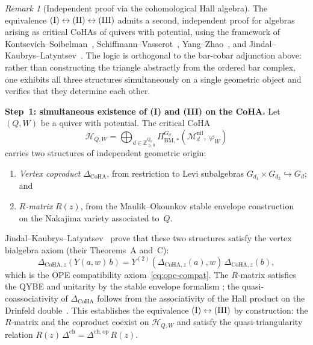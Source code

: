 \documentclass[11pt,reqno]{amsart}
\theoremstyle{definition}
\theoremstyle{remark}
\newtheorem{remark}[theorem]{Remark}
\newcommand{\cH}{\mathcal{H}}
\newcommand{\cM}{\mathcal{M}}
\newcommand{\ZZ}{\mathbb{Z}}
\newcommand{\op}{\mathrm{op}}
\numberwithin{equation}{section}
\begin{document}
\begin{remark}[Independent proof via the cohomological Hall algebra]
\label{rem:independent-proof-coha}
The equivalence $\textup{(I)} \leftrightarrow \textup{(II)}
\leftrightarrow \textup{(III)}$ admits a second, independent
proof for algebras arising as critical CoHAs of quivers with
potential, using the framework of
Kontsevich--Soibelman~\cite{KS11},
Schiffmann--Vasserot~\cite{SV13},
Yang--Zhao~\cite{YZ18a}, and
Jindal--Kaubrys--Latyntsev~\cite{JKL26}. The logic is
orthogonal to the bar-cobar adjunction above: rather than
constructing the triangle abstractly from the ordered bar
complex, one exhibits all three structures simultaneously on a
single geometric object and verifies that they determine each
other.

\smallskip
\noindent\textbf{Step~1: simultaneous existence of (I) and (III)
on the CoHA.}
Let $(Q,W)$ be a quiver with potential. The critical CoHA
\[
  \cH_{Q,W}
  = \bigoplus_{d \in \ZZ_{\geq 0}^{Q_0}}
  H^{G_d}_{\mathrm{BM},*}
  (\cM_d^{\mathrm{nil}},\, \varphi_W)
\]
carries two structures of independent geometric origin:
\begin{enumerate}[label=\textup{(\alph*)}]
\item \emph{Vertex coproduct} $\Delta_{\mathrm{CoHA}}$, from
  restriction to Levi subalgebras
  $G_{d_1} \times G_{d_2} \hookrightarrow G_d$; and
\item \emph{$R$-matrix} $R(z)$, from the
  Maulik--Okounkov stable envelope
  construction~\cite{MO19} on the Nakajima variety
  associated to~$Q$.
\end{enumerate}
Jindal--Kaubrys--Latyntsev~\cite{JKL26} prove that these two
structures satisfy the vertex bialgebra axiom (their
Theorems~A and~C):
\begin{equation}\label{eq:jkl-vertex-bialgebra}
  \Delta_{\mathrm{CoHA},z}(Y(a,w)\,b)
  = Y^{(2)}(\Delta_{\mathrm{CoHA},z}(a),w)\,
  \Delta_{\mathrm{CoHA},z}(b),
\end{equation}
which is the OPE compatibility
axiom~\eqref{eq:ope-compat}. The $R$-matrix satisfies the
QYBE and unitarity by the stable envelope formalism
\cite{MO19}; the quasi-coassociativity of
$\Delta_{\mathrm{CoHA}}$ follows from the
associativity of the Hall product on the Drinfeld
double~\cite{YZ18a}. This establishes the equivalence
$\textup{(I)} \leftrightarrow \textup{(III)}$ by
construction: the $R$-matrix and the coproduct coexist on
$\cH_{Q,W}$ and satisfy the quasi-triangularity relation
$R(z)\, \Delta^{\mathrm{ch}} = \Delta^{\mathrm{ch},\op}\,
R(z)$.


\end{remark}
\end{document}
